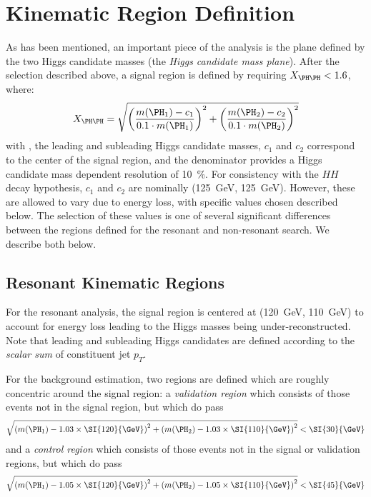\FloatBarrier
\clearpage
\section{Kinematic Region Definition}
\label{sec:kinematic-reg}
As has been mentioned, an important piece of the analysis is the plane defined by the 
two Higgs candidate masses (the \emph{Higgs candidate mass plane}). After the selection
described above, a signal region is defined by requiring $X_{\higgs\higgs} < 1.6$, where:
\begin{equation}
	\label{eqn:xhh-def}
	X_{\higgs\higgs} = \sqrt{\qty(\frac{\mh1 - c_1}{0.1\cdot\mh1})^{2} + 
	\qty(\frac{\mh2 - c_2}{0.1\cdot\mh2})^{2}}
\end{equation}
with ,  the leading and subleading Higgs candidate masses, $c_{1}$ and $c_{2}$ correspond
to the center of the signal region, and the denominator provides a Higgs candidate mass 
dependent resolution of 10~\%. For consistency with the $HH$ decay hypothesis, $c_{1}$ and $c_{2}$
are nominally (\SI{125}{\GeV}, \SI{125}{\GeV}). However, these are allowed to vary due to 
energy loss, with specific values chosen described below. The selection of these values is 
one of several significant differences between the regions defined for the resonant and non-resonant search.
We describe both below.

\subsection{Resonant Kinematic Regions}
For the resonant analysis, the signal region is centered at (\SI{120}{\GeV}, \SI{110}{\GeV}) 
to account for energy loss leading to the Higgs masses being under-reconstructed. Note that leading and 
subleading Higgs candidates are defined according to the 
\emph{scalar sum} of constituent jet $p_{T}$.

For the background estimation, two regions are defined which are roughly concentric around the 
signal region: a \emph{validation region} which 
consists of those events not in the signal region, but which do pass
\begin{equation}
	\label{eqn:val-reg-def}
	\sqrt{\qty(\mh1 - 1.03 \times \SI{120}{\GeV})^{2} + \qty(\mh2 - 1.03 \times
		\SI{110}{\GeV})^{2}} < \SI{30}{\GeV}
\end{equation}
and a \emph{control region} which consists of those events not in the signal or validation
regions, but which do pass
\begin{equation}
	\label{eqn:ctrl-reg-def}
	\sqrt{\qty(\mh1 - 1.05 \times \SI{120}{\GeV})^{2} + \qty(\mh2 - 1.05 \times
		\SI{110}{\GeV})^{2}} < \SI{45}{\GeV}
\end{equation}

